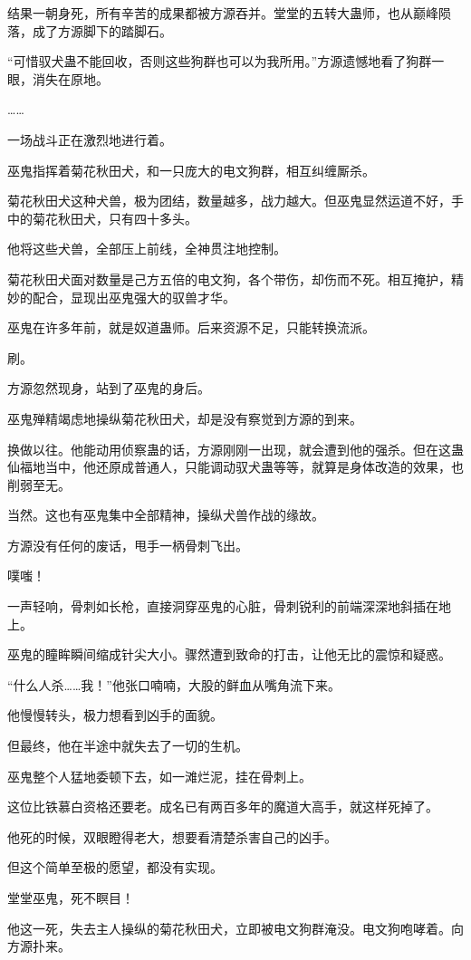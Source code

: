 \begin{this_body}
结果一朝身死，所有辛苦的成果都被方源吞并。堂堂的五转大蛊师，也从巅峰陨落，成了方源脚下的踏脚石。

“可惜驭犬蛊不能回收，否则这些狗群也可以为我所用。”方源遗憾地看了狗群一眼，消失在原地。

……

一场战斗正在激烈地进行着。

巫鬼指挥着菊花秋田犬，和一只庞大的电文狗群，相互纠缠厮杀。

菊花秋田犬这种犬兽，极为团结，数量越多，战力越大。但巫鬼显然运道不好，手中的菊花秋田犬，只有四十多头。

他将这些犬兽，全部压上前线，全神贯注地控制。

菊花秋田犬面对数量是己方五倍的电文狗，各个带伤，却伤而不死。相互掩护，精妙的配合，显现出巫鬼强大的驭兽才华。

巫鬼在许多年前，就是奴道蛊师。后来资源不足，只能转换流派。

刷。

方源忽然现身，站到了巫鬼的身后。

巫鬼殚精竭虑地操纵菊花秋田犬，却是没有察觉到方源的到来。

换做以往。他能动用侦察蛊的话，方源刚刚一出现，就会遭到他的强杀。但在这蛊仙福地当中，他还原成普通人，只能调动驭犬蛊等等，就算是身体改造的效果，也削弱至无。

当然。这也有巫鬼集中全部精神，操纵犬兽作战的缘故。

方源没有任何的废话，甩手一柄骨刺飞出。

噗嗤！

一声轻响，骨刺如长枪，直接洞穿巫鬼的心脏，骨刺锐利的前端深深地斜插在地上。

巫鬼的瞳眸瞬间缩成针尖大小。骤然遭到致命的打击，让他无比的震惊和疑惑。

“什么人杀……我！”他张口喃喃，大股的鲜血从嘴角流下来。

他慢慢转头，极力想看到凶手的面貌。

但最终，他在半途中就失去了一切的生机。

巫鬼整个人猛地委顿下去，如一滩烂泥，挂在骨刺上。

这位比铁慕白资格还要老。成名已有两百多年的魔道大高手，就这样死掉了。

他死的时候，双眼瞪得老大，想要看清楚杀害自己的凶手。

但这个简单至极的愿望，都没有实现。

堂堂巫鬼，死不瞑目！

他这一死，失去主人操纵的菊花秋田犬，立即被电文狗群淹没。电文狗咆哮着。向方源扑来。


\end{this_body}
